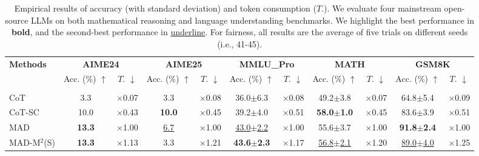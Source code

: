 \documentclass{article} %
\newcommand{\methodname}{MAD-M$^2$}
\theoremstyle{plain}
\begin{document}
\begin{table}[t]
\caption{Empirical results of accuracy (with standard deviation) and token consumption ($T.$). We evaluate four mainstream open-source LLMs on both mathematical reasoning and language understanding benchmarks. We highlight the best performance in \textbf{bold}, and the second-best performance in \uline{underline}. For fairness, all results are the average of five trials on different seeds (i.e., 41-45).}
    \vspace{-8pt}
	\label{tab:main_results}
	\begin{center}
		\begin{small}
		\setlength\tabcolsep{1.6pt}
			\begin{threeparttable}
				\begin{tabular}{lcccccccccc}
					\toprule
                    \multirow{2}{*}{\bf Methods} &
                    \multicolumn{2}{c}{\bf AIME24} &
                    \multicolumn{2}{c}{\bf AIME25} &
                    \multicolumn{2}{c}{\bf MMLU\_Pro} &
                    \multicolumn{2}{c}{\bf MATH}&
                    \multicolumn{2}{c}{\bf GSM8K}\\
                    \cmidrule{2-11}
                    & Acc. (\%) $\uparrow$ & $T$. $\downarrow$ & Acc. (\%) $\uparrow$ & $T$. $\downarrow$ & Acc. (\%) $\uparrow$ & $T$. $\downarrow$ & Acc. (\%) $\uparrow$ & $T$. $\downarrow$ & Acc. (\%) $\uparrow$ & $T$. $\downarrow$\\
                    \midrule
                    \rowcolor{Gray}
                    \multicolumn{11}{c}{\texttt{Qwen2.5-7B-Instruct}} \\
                    \midrule
                    CoT & 3.3 & $\times$0.07  & 3.3 & $\times$0.08 & 36.0$\pm$6.3 & $\times$0.08 & 49.2$\pm$3.8 & $\times$0.07 & 64.8$\pm$5.4 & $\times$0.09\\
                    CoT-SC &10.0 & $\times$0.43 & \textbf{10.0} & $\times$0.45 & 39.2$\pm$4.0 & $\times$0.51 & \textbf{58.0$\pm$1.0} & $\times$0.45 & 83.6$\pm$3.9 & $\times$0.51\\
                    MAD & \textbf{13.3} & $\times$1.00 & \uline{6.7} & $\times$1.00 & \uline{43.0$\pm$2.2} & $\times$1.00 & 55.6$\pm$3.7 & $\times$1.00 & \textbf{91.8$\pm$2.4} & $\times$1.00\\
                    \rowcolor{gray!15}\methodname (S) & \textbf{13.3} & $\times$1.13 & 3.3 & $\times$1.21 & \textbf{43.6$\pm$2.3} & $\times$1.17 & \uline{56.8$\pm$2.1} & $\times$1.20 & \uline{89.0$\pm$4.0} & $\times$1.25\\

\end{tabular}
\end{threeparttable}
\end{small}
\end{center}
\end{table}
\end{document}
